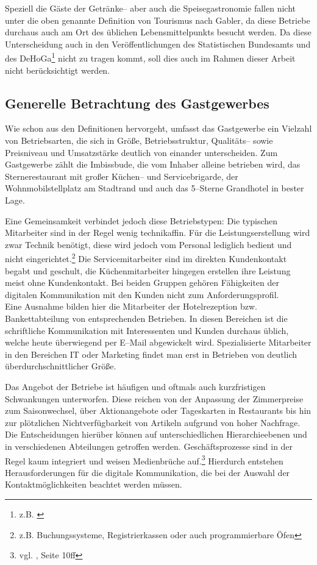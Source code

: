 Speziell die Gäste der Getränke-- aber auch die Speisegastronomie fallen nicht unter die oben genannte Definition von Tourismus nach Gabler, da diese Betriebe durchaus auch am Ort des üblichen Lebensmittelpunkts besucht werden. Da diese Unterscheidung auch in den Veröffentlichungen des Statistischen Bundesamts und des \ac{DeHoGa}\footnote{z.B. \cite{dehoga:zahlenspiegel}} nicht zu tragen kommt, soll dies auch im Rahmen dieser Arbeit nicht berücksichtigt werden.

\subsection{Generelle Betrachtung des Gastgewerbes} %
\label{sec:generelltouri}
Wie schon aus den Definitionen hervorgeht, umfasst das Gastgewerbe ein Vielzahl von Betriebsarten, die sich in Größe, Betriebsstruktur, Qualitäts– sowie Preisniveau und Umsatzstärke deutlich von einander unterscheiden. Zum Gastgewerbe zählt die Imbissbude, die vom Inhaber alleine betrieben wird, das Sternerestaurant mit großer Küchen– und Servicebrigarde, der Wohnmobilstellplatz am Stadtrand und auch das 5–Sterne Grandhotel in bester Lage.

Eine Gemeinsamkeit verbindet jedoch diese Betriebstypen: Die typischen Mitarbeiter sind in der Regel wenig technikaffin. Für die Leistungserstellung wird zwar Technik benötigt, diese wird jedoch vom Personal lediglich bedient und nicht eingerichtet.\footnote{z.B. Buchungssysteme, Registrierkassen oder auch programmierbare Öfen} Die Servicemitarbeiter sind im direkten Kundenkontakt begabt und geschult, die Küchenmitarbeiter hingegen erstellen ihre Leistung meist ohne Kundenkontakt. Bei beiden Gruppen gehören Fähigkeiten der digitalen Kommunikation mit den Kunden nicht zum Anforderungsprofil.\\
Eine Ausnahme bilden hier die Mitarbeiter der Hotelrezeption bzw. Bankettabteilung von entsprechenden Betrieben. In diesen Bereichen ist die schriftliche Kommunikation mit Interessenten und Kunden durchaus üblich, welche heute überwiegend per E–Mail abgewickelt wird. 
Spezialisierte Mitarbeiter in den Bereichen IT oder Marketing findet man erst in Betrieben von deutlich überdurchschnittlicher Größe. 

Das Angebot der Betriebe ist häufigen und oftmals auch kurzfristigen Schwankungen unterworfen. Diese reichen von der Anpassung der Zimmerpreise zum Saisonwechsel, über Aktionangebote oder Tageskarten in Restaurants bis hin zur plötzlichen Nichtverfügbarkeit von Artikeln aufgrund von hoher Nachfrage. Die Entscheidungen hierüber können auf unterschiedlichen Hierarchieebenen und in verschiedenen Abteilungen getroffen werden. Geschäftsprozesse sind in der Regel kaum integriert und weisen Medienbrüche auf.\footnote{vgl. \cite{waidele:integration}, Seite 10ff} Hierdurch entstehen Herausforderungen für die digitale Kommunikation, die bei der Auswahl der Kontaktmöglichkeiten beachtet werden müssen.

